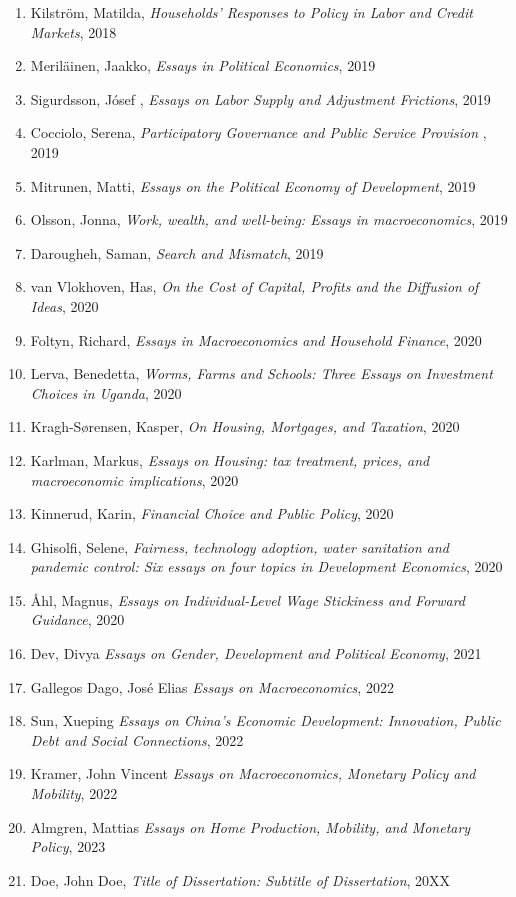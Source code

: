 \begin{spacing}{.5}
\begin{enumerate}
\item Kilstr\"om, Matilda, \emph{Households' Responses to Policy in Labor
and Credit Markets}, 2018
\item Meril\"ainen, Jaakko, \emph{Essays in Political Economics}, 2019
\item Sigurdsson, J\'osef , \emph{Essays on Labor Supply and Adjustment 
Frictions},
2019
\item Cocciolo, Serena, \emph{Participatory Governance and Public Service
Provision }, 2019
\item Mitrunen, Matti, \emph{Essays on the Political Economy of Development}, 
2019
\item Olsson, Jonna, \emph{Work, wealth, and well-being: Essays in 
macroeconomics}, 2019
\item Darougheh, Saman, \emph{Search and Mismatch}, 2019
\item van Vlokhoven, Has, \emph{On the Cost of Capital, Profits and the 
Diffusion of Ideas}, 2020
\item Foltyn, Richard, \emph{Essays in Macroeconomics and Household Finance}, 2020
\item Lerva, Benedetta, \emph{Worms, Farms and Schools: Three Essays on Investment Choices in Uganda}, 2020
\item Kragh-S{\o}rensen, Kasper, \emph{On Housing, Mortgages, and Taxation}, 2020
\item Karlman, Markus, \emph{Essays on Housing: tax treatment, prices, and macroeconomic implications}, 2020
\item Kinnerud, Karin, \emph{Financial Choice and Public Policy}, 2020
\item Ghisolfi, Selene, \emph{Fairness, technology adoption, water sanitation and pandemic control: Six essays on four topics in Development Economics}, 2020
\item \AA hl, Magnus, \emph{Essays on Individual-Level Wage Stickiness and Forward Guidance}, 2020
\item Dev, Divya \emph{Essays on Gender, Development and Political Economy}, 2021
\item Gallegos Dago, José Elias \emph{Essays on Macroeconomics}, 2022
\item Sun, Xueping \emph{Essays on China’s Economic Development: Innovation, Public Debt and Social Connections}, 2022
\item Kramer, John Vincent \emph{Essays on Macroeconomics, Monetary Policy and Mobility}, 2022
\item Almgren, Mattias \emph{Essays on Home Production, Mobility, and Monetary Policy}, 2023
\item Doe, John Doe, \emph{Title of Dissertation: Subtitle of Dissertation}, 20XX
\end{enumerate}
\end{spacing}
